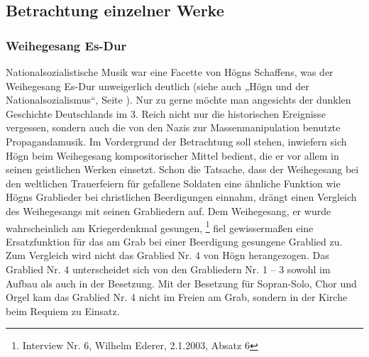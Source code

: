 \subsection{Betrachtung einzelner Werke}


\subsubsection{Weihegesang Es-Dur}

Nationalsozialistische
Musik war eine Facette von Högns Schaffens, was der Weihegesang Es-Dur
unweigerlich deutlich (siehe auch  „Högn und der
Nationalsozialismus“, Seite ). Nur zu gerne
möchte man angesichts der dunklen Geschichte Deutschlands im 3. Reich
nicht nur die historischen Ereignisse vergessen, sondern auch die von
den Nazis zur Massenmanipulation benutzte Propagandamusik. Im
Vordergrund der Betrachtung soll stehen, inwiefern sich Högn beim
Weihegesang kompositorischer Mittel bedient, die er vor allem in seinen
geistlichen Werken einsetzt. Schon die Tatsache, dass der Weihegesang
bei den weltlichen Trauerfeiern für gefallene Soldaten eine ähnliche
Funktion wie Högns Grablieder bei christlichen Beerdigungen einnahm,
drängt einen Vergleich des Weihegesangs mit seinen Grabliedern auf. Dem
Weihegesang, er wurde wahrscheinlich am Kriegerdenkmal
gesungen, \footnote{Interview Nr. 6, Wilhelm Ederer, 2.1.2003, Absatz
6} fiel gewissermaßen eine Ersatzfunktion für das am Grab bei einer
Beerdigung gesungene Grablied zu. Zum Vergleich wird nicht das Grablied
Nr. 4 von Högn herangezogen. Das Grablied Nr. 4 unterscheidet sich von
den Grabliedern Nr. 1 – 3 sowohl im Aufbau als auch in der Besetzung.
Mit der Besetzung für Sopran-Solo, Chor und Orgel kam das Grablied Nr.
4 nicht im Freien am Grab, sondern in der Kirche beim Requiem zu
Einsatz.

